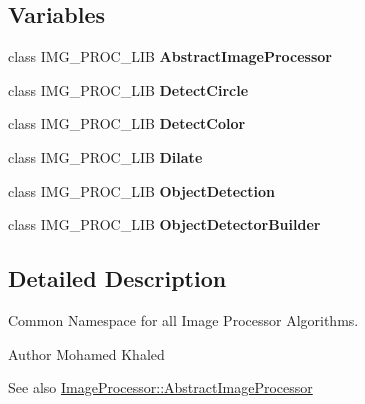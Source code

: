 \subsection*{Variables}
\begin{DoxyCompactItemize}
\item 
\mbox{\label{namespace_image_processor_a54ebb2783a21c8e35e75177583f10035}} 
class I\+M\+G\+\_\+\+P\+R\+O\+C\+\_\+\+L\+IB {\bfseries Abstract\+Image\+Processor}
\item 
\mbox{\label{namespace_image_processor_a79bb80bcee84ab1925990b6788e4f6ff}} 
class I\+M\+G\+\_\+\+P\+R\+O\+C\+\_\+\+L\+IB {\bfseries Detect\+Circle}
\item 
\mbox{\label{namespace_image_processor_a2bc06b3275f90ef421a1001cb6aba025}} 
class I\+M\+G\+\_\+\+P\+R\+O\+C\+\_\+\+L\+IB {\bfseries Detect\+Color}
\item 
\mbox{\label{namespace_image_processor_ad0c53ca4d981a90367e5c9798884cd29}} 
class I\+M\+G\+\_\+\+P\+R\+O\+C\+\_\+\+L\+IB {\bfseries Dilate}
\item 
\mbox{\label{namespace_image_processor_a39edd4e656cf994f97cc12d56daceff4}} 
class I\+M\+G\+\_\+\+P\+R\+O\+C\+\_\+\+L\+IB {\bfseries Object\+Detection}
\item 
\mbox{\label{namespace_image_processor_a32f7946f362df4cd8f78b94629f2b460}} 
class I\+M\+G\+\_\+\+P\+R\+O\+C\+\_\+\+L\+IB {\bfseries Object\+Detector\+Builder}
\end{DoxyCompactItemize}


\subsection{Detailed Description}
Common Namespace for all Image Processor Algorithms. 

\begin{DoxyAuthor}{Author}
Mohamed Khaled 
\end{DoxyAuthor}
\begin{DoxySeeAlso}{See also}
\hyperlink{class_image_processor_1_1_abstract_image_processor}{Image\+Processor\+::\+Abstract\+Image\+Processor} 
\end{DoxySeeAlso}
